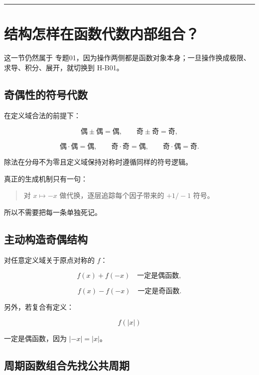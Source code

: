 \documentclass[11pt,a4paper]{ctexart}
\begin{document}
\begin{center}\rule{0.5\linewidth}{0.5pt}\end{center}

\section{结构怎样在函数代数内部组合？}\label{ux7ed3ux6784ux600eux6837ux5728ux51fdux6570ux4ee3ux6570ux5185ux90e8ux7ec4ux5408}

这一节仍然属于
专题01，因为操作两侧都是函数对象本身；一旦操作换成极限、求导、积分、展开，就切换到
H-B01。

\subsection{奇偶性的符号代数}\label{ux5947ux5076ux6027ux7684ux7b26ux53f7ux4ee3ux6570}

在定义域合法的前提下：

\[
\text{偶}\pm\text{偶}=\text{偶},\qquad
\text{奇}\pm\text{奇}=\text{奇},
\]

\[
\text{偶}\cdot\text{偶}=\text{偶},\qquad
\text{奇}\cdot\text{奇}=\text{偶},\qquad
\text{奇}\cdot\text{偶}=\text{奇}.
\]

除法在分母不为零且定义域保持对称时遵循同样的符号逻辑。

真正的生成机制只有一句：

\begin{quote}
对 \(x\mapsto -x\) 做代换，逐层追踪每个因子带来的 \(+1/-1\) 符号。
\end{quote}

所以不需要把每一条单独死记。

\subsection{主动构造奇偶结构}\label{ux4e3bux52a8ux6784ux9020ux5947ux5076ux7ed3ux6784}

对任意定义域关于原点对称的 \(f\)：

\[
f(x)+f(-x)\quad\text{一定是偶函数},
\]

\[
f(x)-f(-x)\quad\text{一定是奇函数}.
\]

另外，若复合有定义：

\[
f(\lvert x\rvert)
\]

一定是偶函数，因为 \(\lvert -x\rvert=\lvert x\rvert\)。

\subsection{周期函数组合先找公共周期}\label{ux5468ux671fux51fdux6570ux7ec4ux5408ux5148ux627eux516cux5171ux5468ux671f}
\end{document}
